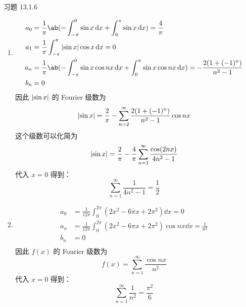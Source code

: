 \begin{problem}
    习题 13.1.6
    \begin{solution}
        \begin{enumerate}
            \item[\textbf{2)}]
            $$
            \begin{aligned}
                a_0 & = \frac{1}{\pi} \ab(-\int_{-\pi}^{0} \sin x \dd{x} + \int_{0}^{\pi} \sin x \dd{x}) = \frac{4}{\pi} \\
                a_1 & = \frac{1}{\pi} \int_{-\pi}^{\pi} \abs{\sin x} \cos x \dd{x} = 0 \\
                a_n & = \frac{1}{\pi} \ab(-\int_{-\pi}^{0} \sin x \cos n x \dd{x} + \int_{0}^{\pi} \sin x \cos n x \dd{x}) = -\frac{2(1 + (-1)^{n})}{n^2 - 1} \\
                b_n & = 0
            \end{aligned}
            $$
            因此 $\abs{\sin x}$ 的 Fourier 级数为
            $$
            \abs{\sin x} = \frac{2}{\pi} - \sum_{n = 2}^{\infty} \frac{2(1 + (-1)^{n})}{n^2 - 1} \cos n x
            $$
            这个级数可以化简为
            $$
            \abs{\sin x} = \frac{2}{\pi} - \frac{4}{\pi} \sum_{n = 1}^{\infty} \frac{\cos (2n x)}{4n^2 - 1}
            $$
            代入 $x = 0$ 得到：
            $$
            \sum_{n = 1}^{\infty} \frac{1}{4n^2 - 1} = \frac{1}{2}
            $$

            \item[\textbf{3)}]
            $$
            \begin{aligned}
                a_0 & = \frac{1}{12\pi} \int_{0}^{2\pi} (2x^2 - 6\pi x + 2\pi^2) \dd{x} = 0 \\
                a_n & = \frac{1}{12\pi} \int_{0}^{2\pi} (2x^2 - 6\pi x + 2\pi^2) \cos n x \dd{x} = \frac{1}{n^2} \\
                b_n & = 0 \\
            \end{aligned}
            $$
            因此 $f(x)$ 的 Fourier 级数为
            $$
            f(x) = \sum_{n = 1}^{\infty} \frac{\cos n x}{n^2}
            $$
            代入 $x = 0$ 得到：
            $$
            \sum_{n = 1}^{\infty} \frac{1}{n^2} = \frac{\pi^2}{6}
            $$
        \end{enumerate}
    \end{solution}
\end{problem}

